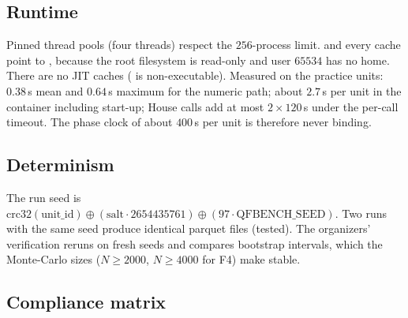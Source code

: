 \subsection{Runtime}

Pinned thread pools (four threads) respect the $256$-process limit.  and every cache point to , because the root filesystem
is read-only and user $65534$ has no home. There are no JIT caches ( is non-executable). Measured on the practice units: $0.38$\,s mean
and $0.64$\,s maximum for the numeric path; about $2.7$\,s per unit in the container including start-up; House calls add at most $2\times120$\,s
under the per-call timeout. The phase clock of about $400$\,s per unit is therefore never binding.

\subsection{Determinism}

The run seed is $\mathrm{crc32}(\text{unit\_id})\oplus(\text{salt}\cdot2654435761)\oplus(97\cdot\text{QFBENCH\_SEED})$. Two runs with the same seed
produce identical parquet files (tested). The organizers' verification reruns on fresh seeds and compares bootstrap intervals, which the
Monte-Carlo sizes ($N\ge2000$, $N\ge4000$ for F4) make stable.

\subsection{Compliance matrix}


